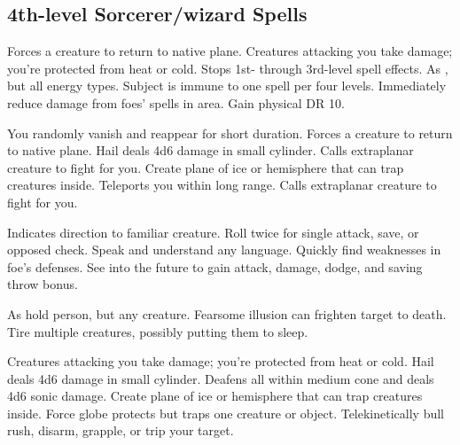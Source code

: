 \subsection{4th-level Sorcerer/wizard Spells} 
\begin{swspelllist}
 Forces a creature to return to native plane.
 Creatures attacking you take damage; you're protected from heat or cold.
 Stops 1st- through 3rd-level spell effects.
 As , but all energy types.
 Subject is immune to one spell per four levels.
 Immediately reduce damage from foes' spells in area.
 Gain physical DR 10.

 You randomly vanish and reappear for short duration.
 Forces a creature to return to native plane.
 Hail deals 4d6 damage in small cylinder.
 Calls extraplanar creature to fight for you.
 Create plane of ice or hemisphere that can trap creatures inside.
 Teleports you within long range.
 Calls extraplanar creature to fight for you.

 Indicates direction to familiar creature.
 Roll twice for single attack, save, or opposed check.
 Speak and understand any language.
 Quickly find weaknesses in foe's defenses.
 See into the future to gain attack, damage, dodge, and saving throw bonus.

 As hold person, but any creature.
 Fearsome illusion can frighten target to death.
 Tire multiple creatures, possibly putting them to sleep.
\spellheadrestricted{}
\spellheadrestricted{}

 Creatures attacking you take damage; you're protected from heat or cold.
 Hail deals 4d6 damage in small cylinder.
 Deafens all within medium cone and deals 4d6 sonic damage.
 Create plane of ice or hemisphere that can trap creatures inside.
 Force globe protects but traps one creature or object.
 Telekinetically bull rush, disarm, grapple, or trip your target.


\end{swspelllist}
